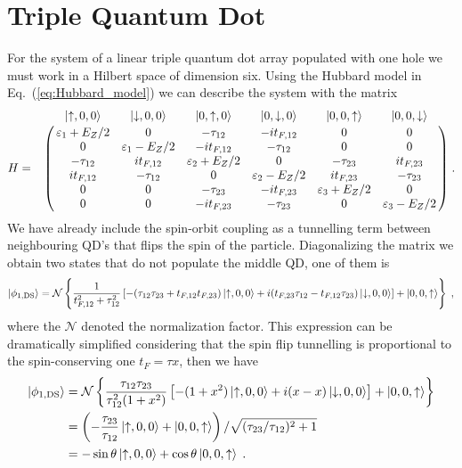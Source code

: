 \documentclass[a4paper,11pt]{article}
\begin{document}
\section{Triple Quantum Dot}
For the system of a linear triple quantum dot array populated with one hole we must work in a Hilbert space of dimension six. Using the Hubbard model in Eq.~(\ref{eq:Hubbard_model}) we can describe the system with the matrix
\begin{equation}
H=\bordermatrix{~ & \ket{\uparrow,0,0} & \ket{\downarrow,0,0} & \ket{0,\uparrow,0} & \ket{0,\downarrow,0}& \ket{0,0,\uparrow} & \ket{0,0,\downarrow}\cr
	~ & \varepsilon_1+E_Z/2 & 0 & -\tau_{12} & -it_{F,12} & 0 & 0 \cr
	~ & 0 & \varepsilon_1-E_Z/2 & -it_{F,12} & -\tau_{12} & 0 & 0 \cr
	~ & -\tau_{12} & it_{F,12} & \varepsilon_2+E_Z/2 & 0 & -\tau_{23} & it_{F,23} \cr
	~ & it_{F,12} & -\tau_{12} & 0 & \varepsilon_2-E_Z/2 & it_{F,23} & -\tau_{23} \cr
	~ & 0 & 0 & -\tau_{23} & -it_{F,23} & \varepsilon_3+E_Z/2 & 0 \cr
	~ & 0 & 0 & -it_{F,23} & -\tau_{23} & 0 & \varepsilon_3-E_Z/2 \cr}\; .
\end{equation}
We have already include the spin-orbit coupling as a tunnelling term between neighbouring QD's that flips the spin of the particle. Diagonalizing the matrix we obtain two states that do not populate the middle QD, one of them is
\begin{equation}
	\ket{\phi_{1,\text{DS}}}=\mathcal{N}\left\{\frac{1}{t_{F,12}^2+\tau_{12}^2}\left[-(\tau_{12}\tau_{23}+t_{F,12}t_{F,23})\ket{\uparrow,0,0}+i(t_{F,23}\tau_{12}-t_{F,12}\tau_{23})\ket{\downarrow,0,0}\right]+\ket{0,0,\uparrow}\right\}\; ,
\end{equation}
where the $\mathcal{N}$ denoted the normalization factor. This expression can be dramatically simplified considering that the spin flip tunnelling is proportional to the spin-conserving one $t_F=\tau x$, then we have
\begin{equation}
	\begin{split}
	\ket{\phi_{1,\text{DS}}}&=\mathcal{N}\left\{\frac{\tau_{12}\tau_{23}}{\tau_{12}^2(1+x^2)}\left[-(1+x^2)\ket{\uparrow,0,0}+i(x-x)\ket{\downarrow,0,0}\right]+\ket{0,0,\uparrow}\right\}\\
	&=\left(-\frac{\tau_{23}}{\tau_{12}}\ket{\uparrow,0,0}+\ket{0,0,\uparrow}\right)/\sqrt{(\tau_{23}/\tau_{12})^2+1}\\
	&=-\sin\theta\ket{\uparrow,0,0}+\cos\theta\ket{0,0,\uparrow}\; .
	\end{split}
	\label{eq:dark_state_1}
\end{equation}
\end{document}
